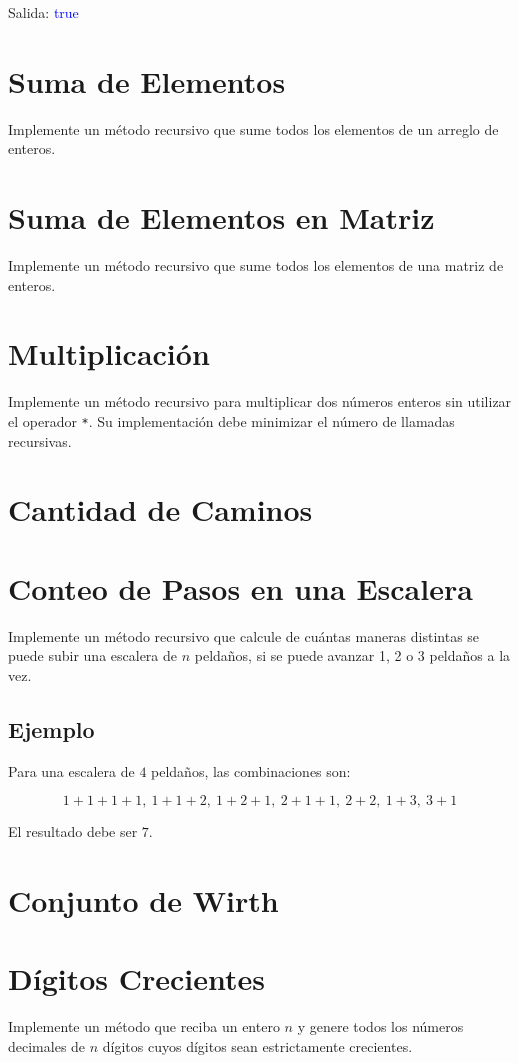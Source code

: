 Salida: \textcolor{blue}{true}

\section{Suma de Elementos}  
Implemente un método recursivo que sume todos los elementos de un arreglo de enteros.  

\section{Suma de Elementos en Matriz}  
Implemente un método recursivo que sume todos los elementos de una matriz de enteros.

\section{Multiplicación}  
Implemente un método recursivo para multiplicar dos números enteros sin utilizar el operador \texttt{*}. Su implementación debe minimizar el número de llamadas recursivas.  

\section{Cantidad de Caminos}  
  

\section{Conteo de Pasos en una Escalera}
Implemente un método recursivo que calcule de cuántas maneras distintas se puede subir una escalera de \( n \) peldaños, si se puede avanzar 1, 2 o 3 peldaños a la vez.  

\subsection*{Ejemplo}
Para una escalera de \( 4 \) peldaños, las combinaciones son:

\[
1+1+1+1,\ 1+1+2,\ 1+2+1,\ 2+1+1,\ 2+2,\ 1+3,\ 3+1
\]

El resultado debe ser \( 7 \).

\section{Conjunto de Wirth}  
  

\section{Dígitos Crecientes}  
Implemente un método que reciba un entero \( n \) y genere todos los números decimales de \( n \) dígitos cuyos dígitos sean estrictamente crecientes. 

